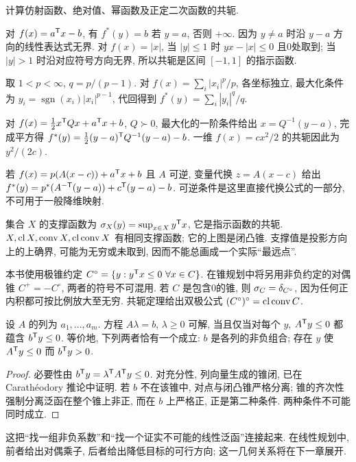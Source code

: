\begin{example}
\label{ex:conjugate-models}
计算仿射函数、绝对值、幂函数及正定二次函数的共轭.
\end{example}
\begin{solution}
对 $f(x)=a^{\mathsf T} x-b$, 有 $f^*(y)=b$ 若 $y=a$, 否则 $+\infty$. 因为 $y\ne a$ 时沿 $y-a$ 方向的线性表达式无界. 对 $f(x)=|x|$, 当 $|y|\le1$ 时 $yx-|x|\le0$ 且0处取到; 当 $|y|>1$ 时沿对应符号方向无界, 所以共轭是区间 $[-1,1]$ 的指示函数.

取 $1<p<\infty$, $q=p/(p-1)$. 对 $f(x)=\sum_i|x_i|^p/p$, 各坐标独立, 最大化条件为 $y_i=\operatorname{sgn}(x_i)|x_i|^{p-1}$, 代回得到 $f^*(y)=\sum_i|y_i|^q/q$.

对 $f(x)=\tfrac12x^{\mathsf T} Qx+a^{\mathsf T} x+b$, $Q\succ0$, 最大化的一阶条件给出 $x=Q^{-1}(y-a)$, 完成平方得 $f^*(y)=\tfrac12(y-a)^{\mathsf T} Q^{-1}(y-a)-b$. 一维 $f(x)=cx^2/2$ 的共轭因此为 $y^2/(2c)$.
\end{solution}
若 $f(x)=p(A(x-c))+a^{\mathsf T} x+b$ 且 $A$ 可逆, 变量代换 $z=A(x-c)$ 给出
$f^*(y)=p^*(A^{-\mathsf T}(y-a))+c^{\mathsf T}(y-a)-b$. 可逆条件是这里直接代换公式的一部分, 不可用于一般降维映射.

集合 $X$ 的支撑函数为 $\sigma_X(y)=\sup_{x\in X}y^{\mathsf T} x$, 它是指示函数的共轭. $X,\operatorname{cl} X,\operatorname{conv} X,\operatorname{cl}\operatorname{conv} X$ 有相同支撑函数; 它的上图是闭凸锥. 支撑值是投影方向上的上确界, 可能为无穷或未取到, 因而不能总画成一个实际“最远点”.

本书使用极锥约定 $C^\circ=\{y:y\T x\le0\ \forall x\in C\}$. 在锥规划中将另用非负约定的对偶锥 $C^+=-C^\circ$, 两者的符号不可混用. 若 $C$ 是包含0的锥, 则 $\sigma_C=\delta_{C^\circ}$, 因为任何正内积都可按比例放大至无穷. 共轭定理给出双极公式 $(C^\circ)^\circ=\operatorname{cl}\operatorname{conv} C$.

\begin{theorem}[Farkas 引理]\label{thm:farkas}
设 $A$ 的列为 $a_1,\ldots,a_m$. 方程 $A\lambda=b$, $\lambda\ge0$ 可解, 当且仅当对每个 $y$, $A^{\mathsf T} y\le0$ 都蕴含 $b^{\mathsf T} y\le0$. 等价地, 下列两者恰有一个成立: $b$ 是各列的非负组合; 存在 $y$ 使 $A^{\mathsf T} y\le0$ 而 $b^{\mathsf T} y>0$.
\end{theorem}
\begin{proof}
必要性由 $b^{\mathsf T} y=\lambda^{\mathsf T} A^{\mathsf T} y\le0$. 对充分性, 列向量生成的锥闭, 已在 Carathéodory 推论中证明. 若 $b$ 不在该锥中, 对点与闭凸锥严格分离; 锥的齐次性强制分离泛函在整个锥上非正, 而在 $b$ 上严格正, 正是第二种条件. 两种条件不可能同时成立.
\end{proof}
这把“找一组非负系数”和“找一个证实不可能的线性泛函”连接起来. 在线性规划中, 前者给出对偶乘子, 后者给出降低目标的可行方向; 这一几何关系将在下一章展开.

